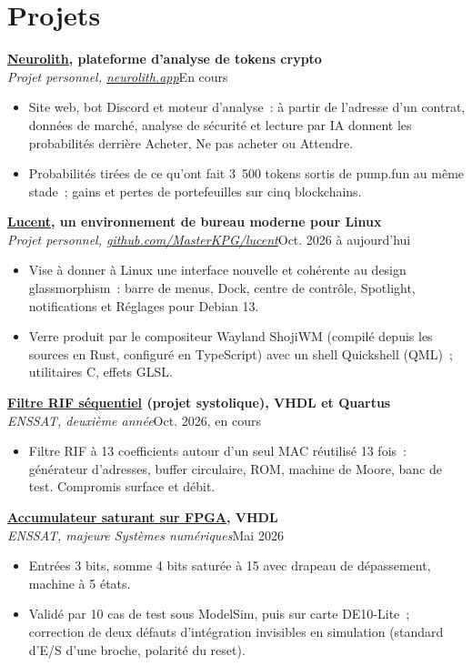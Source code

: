 \documentclass[10pt,a4paper]{article}
\newcommand{\entry}[3]{%
  \par\addvspace{6pt}%
  \noindent\textbf{#1}\\
  \textit{#2}\hfill #3\par
}
\newcommand{\project}[2]{\href{https://masterkpg.github.io/\#project-#1}{#2}}
\begin{document}
\section*{Projets}

\entry{\project{neurolith}{Neurolith}, plateforme d'analyse de tokens crypto}{Projet personnel, \href{https://neurolith.app}{neurolith.app}}{En cours}
\begin{itemize}
  \item Site web, bot Discord et moteur d'analyse~: à partir de l'adresse d'un contrat, données de
        marché, analyse de sécurité et lecture par IA donnent les probabilités derrière Acheter, Ne
        pas acheter ou Attendre.
  \item Probabilités tirées de ce qu'ont fait 3~500 tokens sortis de pump.fun au même stade~; gains
        et pertes de portefeuilles sur cinq blockchains.
\end{itemize}

\entry{\project{lucent}{Lucent}, un environnement de bureau moderne pour Linux}{Projet personnel, \href{https://github.com/MasterKPG/lucent}{github.com/MasterKPG/lucent}}{Oct. 2026 à aujourd'hui}
\begin{itemize}
  \item Vise à donner à Linux une interface nouvelle et cohérente au design glassmorphism~: barre de
        menus, Dock, centre de contrôle, Spotlight, notifications et Réglages pour Debian 13.
  \item Verre produit par le compositeur Wayland ShojiWM (compilé depuis les sources en Rust,
        configuré en TypeScript) avec un shell Quickshell (QML)~; utilitaires C, effets GLSL.
\end{itemize}

\entry{\project{fir-filter}{Filtre RIF séquentiel} (projet systolique), VHDL et Quartus}{ENSSAT, deuxième année}{Oct. 2026, en cours}
\begin{itemize}
  \item Filtre RIF à 13 coefficients autour d'un seul MAC réutilisé 13 fois~: générateur d'adresses,
        buffer circulaire, ROM, machine de Moore, banc de test. Compromis surface et débit.
\end{itemize}

\entry{\project{saturating-accumulator}{Accumulateur saturant sur FPGA}, VHDL}{ENSSAT, majeure Systèmes numériques}{Mai 2026}
\begin{itemize}
  \item Entrées 3 bits, somme 4 bits saturée à 15 avec drapeau de dépassement, machine à 5 états.
  \item Validé par 10 cas de test sous ModelSim, puis sur carte DE10-Lite~; correction de deux
        défauts d'intégration invisibles en simulation (standard d'E/S d'une broche, polarité du
        reset).
\end{itemize}
\end{document}
